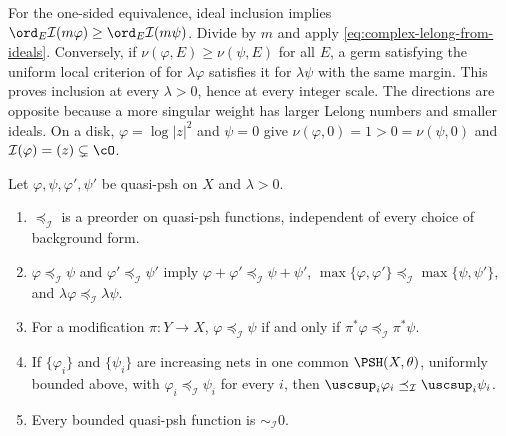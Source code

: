 For the one-sided equivalence, ideal inclusion implies
$\ord_E\mathcal I(m\varphi)\geq\ord_E\mathcal I(m\psi)$.
Divide by $m$ and apply \eqref{eq:complex-lelong-from-ideals}.
Conversely, if $\nu(\varphi,E)\geq\nu(\psi,E)$ for all $E$, a germ
satisfying the uniform local criterion of
 for $\lambda\varphi$ satisfies
it for $\lambda\psi$ with the same margin.  This proves inclusion at
every $\lambda>0$, hence at every integer scale.
The directions are opposite because a more singular weight has larger
Lelong numbers and smaller ideals.  On a disk, $\varphi=\log|z|^2$ and
$\psi=0$ give $\nu(\varphi,0)=1>0=\nu(\psi,0)$ and
$\mathcal I(\varphi)=(z)\subsetneq\cO$.

\begin{proposition}
\label{prop:ch51-i-calculus}
Let $\varphi,\psi,\varphi',\psi'$ be quasi-psh on $X$ and
$\lambda>0$.
\begin{enumerate}
\item\label{itm:ch51-ic:preorder}
      $\preceq_{\mathcal I}$ is a preorder on quasi-psh functions,
      independent of every choice of background form.
\item\label{itm:ch51-ic:sum}
      $\varphi\preceq_{\mathcal I}\psi$ and
      $\varphi'\preceq_{\mathcal I}\psi'$ imply
      $\varphi+\varphi'\preceq_{\mathcal I}\psi+\psi'$,
      $\max\{\varphi,\varphi'\}\preceq_{\mathcal I}
      \max\{\psi,\psi'\}$, and
      $\lambda\varphi\preceq_{\mathcal I}\lambda\psi$.
\item\label{itm:ch51-ic:pullback}
      For a modification $\pi:Y\to X$,
      $\varphi\preceq_{\mathcal I}\psi$ if and only if
      $\pi^*\varphi\preceq_{\mathcal I}\pi^*\psi$.
\item\label{itm:ch51-ic:increasing}
      If $\{\varphi_i\}$ and $\{\psi_i\}$ are increasing nets in one
      common $\PSH(X,\theta)$, uniformly bounded above, with
      $\varphi_i\preceq_{\mathcal I}\psi_i$ for every $i$, then
      $\uscsup_i\varphi_i\preceq_{\mathcal I}\uscsup_i\psi_i$.
\item\label{itm:ch51-ic:bounded}
      Every bounded quasi-psh function is $\sim_{\mathcal I}0$.
\end{enumerate}
\end{proposition}

